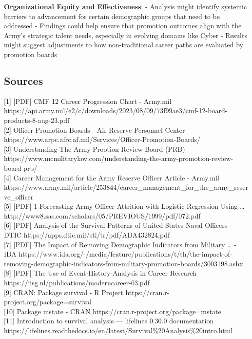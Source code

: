 \documentclass[
  letterpaper,
  DIV=11,
  numbers=noendperiod]{scrartcl}
\begin{document}
\textbf{Organizational Equity and Effectiveness}: - Analysis might
identify systemic barriers to advancement for certain demographic groups
that need to be addressed - Findings could help ensure that promotion
outcomes align with the Army's strategic talent needs, especially in
evolving domains like Cyber - Results might suggest adjustments to how
non-traditional career paths are evaluated by promotion boards

\subsection{Sources}\label{sources}

{[}1{]} {[}PDF{]} CMF 12 Career Progression Chart - Army.mil
https://api.army.mil/e2/c/downloads/2023/08/09/73f99ae3/cmf-12-board-products-8-aug-23.pdf\\
{[}2{]} Officer Promotion Boards - Air Reserve Personnel Center
https://www.arpc.afrc.af.mil/Services/Officer-Promotion-Boards/\\
{[}3{]} Understanding The Army Prootion Review Board (PRB)
https://www.mcmilitarylaw.com/understanding-the-army-promotion-review-board-prb/\\
{[}4{]} Career Management for the Army Reserve Officer \textbar{}
Article - Army.mil
https://www.army.mil/article/253844/career\_management\_for\_the\_army\_reserve\_officer\\
{[}5{]} {[}PDF{]} 1 Forecasting Army Officer Attrition with Logistic
Regression Using \ldots{}
http://www8.sas.com/scholars/05/PREVIOUS/1999/pdf/072.pdf\\
{[}6{]} {[}PDF{]} Analysis of the Survival Patterns of United States
Naval Officers - DTIC https://apps.dtic.mil/sti/tr/pdf/ADA432824.pdf\\
{[}7{]} {[}PDF{]} The Impact of Removing Demographic Indicators from
Military \ldots{} - IDA
https://www.ida.org/-/media/feature/publications/t/th/the-impact-of-removing-demographic-indicators-from-military-promotion-boards/3003198.ashx\\
{[}8{]} {[}PDF{]} The Use of Event-History-Analysis in Career Research
https://iisg.nl/publications/moderncareer-03.pdf\\
{[}9{]} CRAN: Package survival - R Project
https://cran.r-project.org/package=survival\\
{[}10{]} Package mstate - CRAN
https://cran.r-project.org/package=mstate\\
{[}11{]} Introduction to survival analysis --- lifelines 0.30.0
documentation
https://lifelines.readthedocs.io/en/latest/Survival\%20Analysis\%20intro.html\\
\end{document}
